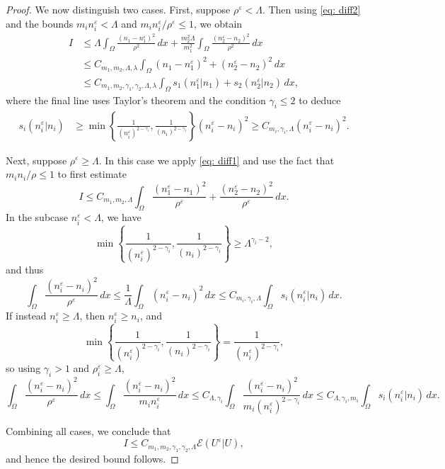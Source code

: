 \documentclass[10pt,reqno]{amsart}
\numberwithin{equation}{section}
\newcommand{\ve}{\varepsilon}
\begin{document}
\begin{proof}
    
 We now distinguish two cases. First, suppose $\rho^\ve < \Lambda$. Then using \eqref{eq: diff2} and the bounds $m_in_i^\ve < \Lambda$ and $m_in_i^\ve / \rho^\ve \le 1$, we obtain
    \begin{align*}
        I &\le \Lambda \int_\Omega \frac{(n_1-n_1^\ve)^2}{\rho^2} \,dx + \frac{m_2^2 \Lambda}{m_1^2} \int_\Omega \frac{(n_2^\ve - n_2)^2}{\rho^2}\,dx \\
        &\le C_{m_1,m_2,\Lambda,\lambda} \int_\Omega (n_1-n_1^\ve)^2 + (n_2^\ve-n_2)^2\,dx \\
        &\le C_{m_1,m_2,\gamma_1,\gamma_2,\Lambda,\lambda} \int_\Omega s_1(n_1^\ve|n_1) + s_2(n_2^\ve|n_2)\,dx,
    \end{align*}
where the final line uses Taylor's theorem and the condition $\gamma_i \le 2$ to deduce
    \begin{align*}
         s_i(n_i^\ve|n_i) &\ge \min\left\{\frac{1}{(n_i^\ve)^{2-\gamma_i}}, \frac{1}{(n_i)^{2-\gamma_i}} \right\} (n_i^\ve - n_i)^2 \ge C_{m_i,\gamma_i,\Lambda} (n_i^\ve - n_i)^2.
    \end{align*}

Next, suppose $\rho^\ve \ge \Lambda$. In this case we apply \eqref{eq: diff1} and use the fact that $m_in_i / \rho \le 1$ to first estimate
\[%
        I \le C_{m_1,m_2,\Lambda} \int_\Omega \frac{(n_1^\ve-n_1)^2}{\rho^\ve} + \frac{(n_2^\ve-n_2)^2}{\rho^\ve}\,dx.
\]%
In the subcase $n_i^\ve < \Lambda$, we have
\[
        \min\left\{\frac{1}{(n_i^\ve)^{2-\gamma_i}}, \frac{1}{(n_i)^{2-\gamma_i}}\right\} \ge \Lambda^{\gamma_i-2},
\]
and thus
\[
        \int_\Omega \frac{(n_i^\ve-n_i)^2}{\rho^\ve}\,dx \le \frac{1}{\Lambda}\int_\Omega (n_i^\ve - n_i)^2\,dx \le C_{m_i,\gamma_i,\Lambda}\int_\Omega s_i(n_i^\ve|n_i)\,dx.
\]
If instead $n_i^\ve \ge \Lambda$, then $n_i^\ve \ge n_i$, and
\[
        \min\left\{\frac{1}{(n_i^\ve)^{2-\gamma_i}}, \frac{1}{(n_i)^{2-\gamma_i}}\right\} = \frac{1}{(n_i^\ve)^{2-\gamma_i}},
\]
so using $\gamma_i > 1$ and $\rho_i^\ve \ge \Lambda$,
\[
        \int_\Omega \frac{(n_i^\ve-n_i)^2}{\rho^\ve}\,dx \le \int_\Omega \frac{(n_i^\ve-n_i)^2}{m_in_i^\ve}\,dx \le C_{\Lambda,\gamma_i} \int_\Omega \frac{(n_i^\ve-n_i)^2}{m_i (n_i^\ve)^{2-\gamma_i}}\,dx \le C_{\Lambda,\gamma_i,m_i} \int_\Omega s_i(n_i^\ve|n_i)\,dx.
\]

Combining all cases, we conclude that
\[
    I \le C_{m_1, m_2, \gamma_1, \gamma_2, \Lambda} \mathcal{E}(U^\ve|U),
\]
and hence the desired bound follows.
\end{proof}
\end{document}
